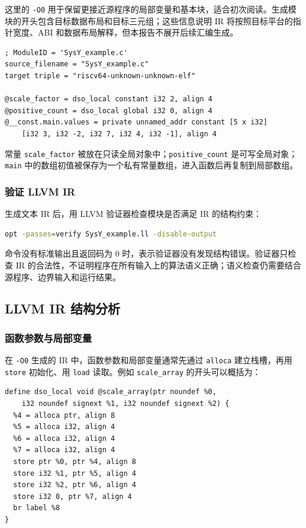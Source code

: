 \documentclass[a4paper]{article}
\begin{document}
这里的 \texttt{-O0} 用于保留更接近源程序的局部变量和基本块，适合初次阅读。生成模块的开头包含目标数据布局和目标三元组；这些信息说明 IR 将按照目标平台的指针宽度、ABI 和数据布局解释，但本报告不展开后续汇编生成。

\begin{lstlisting}[language=LLVMIR,caption={LLVM IR 模块头和全局对象},label={lst:module}]
; ModuleID = 'SysY_example.c'
source_filename = "SysY_example.c"
target triple = "riscv64-unknown-unknown-elf"

@scale_factor = dso_local constant i32 2, align 4
@positive_count = dso_local global i32 0, align 4
@__const.main.values = private unnamed_addr constant [5 x i32]
    [i32 3, i32 -2, i32 7, i32 4, i32 -1], align 4
\end{lstlisting}

常量 \texttt{scale\_factor} 被放在只读全局对象中；\texttt{positive\_count} 是可写全局对象；\texttt{main} 中的数组初值被保存为一个私有常量数组，进入函数后再复制到局部数组。

\subsubsection{验证 LLVM IR}

生成文本 IR 后，用 LLVM 验证器检查模块是否满足 IR 的结构约束：

\begin{lstlisting}[language=bash,caption={验证 LLVM IR}]
opt -passes=verify SysY_example.ll -disable-output
\end{lstlisting}

命令没有标准输出且返回码为 $0$ 时，表示验证器没有发现结构错误。验证器只检查 IR 的合法性，不证明程序在所有输入上的算法语义正确；语义检查仍需要结合源程序、边界输入和运行结果。

\subsection{LLVM IR 结构分析}

\subsubsection{函数参数与局部变量}

在 \texttt{-O0} 生成的 IR 中，函数参数和局部变量通常先通过 \texttt{alloca} 建立栈槽，再用 \texttt{store} 初始化、用 \texttt{load} 读取。例如 \texttt{scale\_array} 的开头可以概括为：

\begin{lstlisting}[language=LLVMIR,caption={scale\_array 的参数与局部变量初始化}]
define dso_local void @scale_array(ptr noundef %0,
    i32 noundef signext %1, i32 noundef signext %2) {
  %4 = alloca ptr, align 8
  %5 = alloca i32, align 4
  %6 = alloca i32, align 4
  %7 = alloca i32, align 4
  store ptr %0, ptr %4, align 8
  store i32 %1, ptr %5, align 4
  store i32 %2, ptr %6, align 4
  store i32 0, ptr %7, align 4
  br label %8
}
\end{lstlisting}
\end{document}
